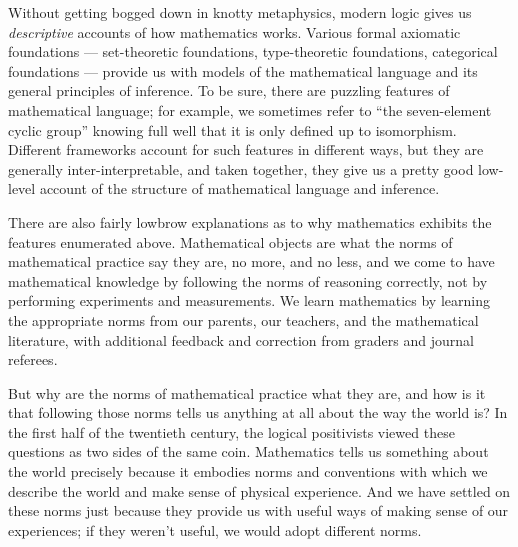 \documentclass[12pt]{article}
\begin{document}
Without getting bogged down in knotty metaphysics, modern logic gives us \emph{descriptive} accounts of how mathematics works. Various formal axiomatic foundations --- set-theoretic foundations, type-theoretic foundations, categorical foundations --- provide us with models of the mathematical language and its general principles of inference. To be sure, there are puzzling features of mathematical language; for example, we sometimes refer to ``the seven-element cyclic group'' knowing full well that it is only defined up to isomorphism. Different frameworks account for such features in different ways, but they are generally inter-interpretable, and taken together, they give us a pretty good low-level account of the structure of mathematical language and inference.

There are also fairly lowbrow explanations as to why mathematics exhibits the features enumerated above. Mathematical objects are what the norms of mathematical practice say they are, no more, and no less, and we come to have mathematical knowledge by following the norms of reasoning correctly, not by performing experiments and measurements. We learn mathematics by learning the appropriate norms from our parents, our teachers, and the mathematical literature, with additional feedback and correction from graders and journal referees. 

But why are the norms of mathematical practice what they are, and how is it that following those norms tells us anything at all about the way the world is? In the first half of the twentieth century, the logical positivists viewed these questions as two sides of the same coin. Mathematics tells us something about the world precisely because it embodies norms and conventions with which we describe the world and make sense of physical experience. And we have settled on these norms just because they provide us with useful ways of making sense of our experiences; if they weren't useful, we would adopt different norms. 
\end{document}

